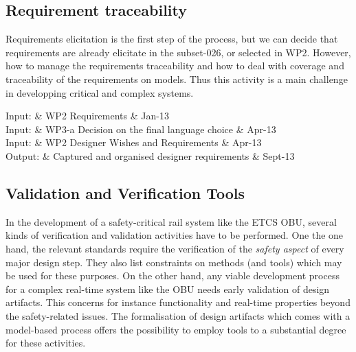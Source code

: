 \documentclass{template/openetcs_article}
\begin{document}
\subsection{Requirement traceability}

Requirements elicitation is the first step of the process, but we can decide that requirements are already elicitate in the subset-026, or selected in WP2. However, how to manage the requirements traceability and how to deal with coverage and traceability of the requirements on models. Thus this activity is a main challenge in developping critical and complex systems.

\begin{inoutput}
Input: & WP2 Requirements & Jan-13 \\
Input: & WP3-a  Decision on the final language choice & Apr-13 \\
Input: & WP2 Designer Wishes and Requirements & Apr-13 \\
\hline
Output: & Captured and organised designer requirements & Sept-13 \\
\end{inoutput}



\subsection{Validation and Verification Tools}

In the development of a safety-critical rail system like the ETCS OBU,
several kinds of verification and validation activities have to be
performed. One the one hand, the relevant standards require the
verification of the \emph{safety aspect} of every major design
step. They also list constraints on methods (and tools) which may be used for these
purposes.  On the other hand, any viable development process for a
complex real-time system like the OBU needs early validation of design
artifacts. This concerns for instance functionality and real-time
properties beyond the safety-related issues. The formalisation of
design artifacts which comes with a model-based process offers the
possibility to employ tools to a substantial degree for these
activities. 
\end{document}
